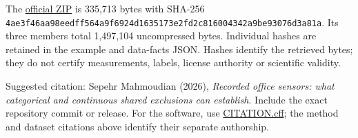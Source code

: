 The \href{https://archive.ics.uci.edu/static/public/357/occupancy+detection.zip}{official ZIP} is 335,713 bytes with SHA-256 \texttt{4ae3f46aa98eedff564a9f6924d1635173e2fd2c816004342a9be93076d3a81a}. Its three members total 1,497,104 uncompressed bytes. Individual hashes are retained in the example and data-facts JSON. Hashes identify the retrieved bytes; they do not certify measurements, labels, license authority or scientific validity.

Suggested citation: Sepehr Mahmoudian (2026), \emph{Recorded office sensors: what categorical and continuous shared exclusions can establish}. Include the exact repository commit or release. For the software, use \href{https://github.com/sepahead/pid-rs/blob/main/CITATION.cff}{CITATION.cff}; the method and dataset citations above identify their separate authorship.
